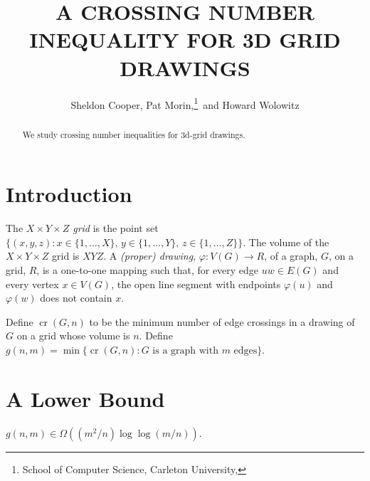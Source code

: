 \documentclass{patmorin}
\title{\MakeUppercase{A Crossing Number Inequality for 3D Grid Drawings}}
\author{Sheldon Cooper, Pat Morin,\thanks{School of Computer Science, Carleton University, \email{morin@scs.carleton.ca}}\ and Howard Wolowitz}
\DeclareMathOperator{\crs}{cr}
\begin{document}
\maketitle

\begin{abstract}
   We study crossing number inequalities for 3d-grid drawings.
\end{abstract}

\section{Introduction}

The \emph{$X\times Y\times Z$ grid} is the point set $\{(x,y,z):
x\in\{1,\ldots,X\},\, y\in\{1,\ldots,Y\},\, z\in\{1,\ldots,Z\}\}$.
The volume of the $X\times Y\times Z$ grid is $XYZ$. A \emph{(proper)
drawing}, $\varphi:V(G)\rightarrow R$, of a graph, $G$, on a grid,
$R$, is a one-to-one mapping such that, for every edge $uw\in E(G)$ and
every vertex $x\in V(G)$, the open line segment with endpoints $\varphi(u)$ and $\varphi(w)$
does not contain $x$.

Define $\crs(G,n)$ to be the minimum number of edge crossings
in a drawing of $G$ on a grid whose volume is $n$.  Define
$g(n,m)=\min\{\crs(G,n):\text{$G$ is a graph with $m$ edges}\}$.


\section{A Lower Bound}

\begin{thm}
  $g(n,m) \in \Omega((m^2/n)\log\log (m/n))$.
\end{thm}
\end{document}
